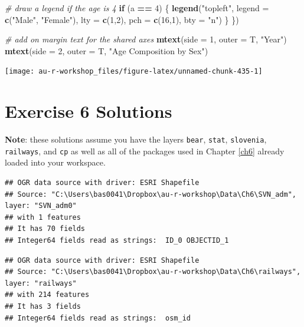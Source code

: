\documentclass[]{book}
\newenvironment{Shaded}{\begin{snugshade}}{\end{snugshade}}
\newcommand{\KeywordTok}[1]{\textcolor[rgb]{0.13,0.29,0.53}{\textbf{#1}}}
\newcommand{\DataTypeTok}[1]{\textcolor[rgb]{0.13,0.29,0.53}{#1}}
\newcommand{\DecValTok}[1]{\textcolor[rgb]{0.00,0.00,0.81}{#1}}
\newcommand{\StringTok}[1]{\textcolor[rgb]{0.31,0.60,0.02}{#1}}
\newcommand{\CommentTok}[1]{\textcolor[rgb]{0.56,0.35,0.01}{\textit{#1}}}
\newcommand{\ControlFlowTok}[1]{\textcolor[rgb]{0.13,0.29,0.53}{\textbf{#1}}}
\newcommand{\OperatorTok}[1]{\textcolor[rgb]{0.81,0.36,0.00}{\textbf{#1}}}
\newcommand{\NormalTok}[1]{#1}
\theoremstyle{definition}
\theoremstyle{definition}
\theoremstyle{definition}
\theoremstyle{remark}
\begin{document}
\begin{Shaded}
\begin{Highlighting}[]
  \CommentTok{# draw a legend if the age is 4}
  \ControlFlowTok{if}\NormalTok{ (a }\OperatorTok{==}\StringTok{ }\DecValTok{4}\NormalTok{) \{}
    \KeywordTok{legend}\NormalTok{(}\StringTok{"topleft"}\NormalTok{, }\DataTypeTok{legend =} \KeywordTok{c}\NormalTok{(}\StringTok{"Male"}\NormalTok{, }\StringTok{"Female"}\NormalTok{),}
           \DataTypeTok{lty =} \KeywordTok{c}\NormalTok{(}\DecValTok{1}\NormalTok{,}\DecValTok{2}\NormalTok{), }\DataTypeTok{pch =} \KeywordTok{c}\NormalTok{(}\DecValTok{16}\NormalTok{,}\DecValTok{1}\NormalTok{), }\DataTypeTok{bty =} \StringTok{"n"}\NormalTok{)}
\NormalTok{  \}}
\NormalTok{\})}

\CommentTok{# add on margin text for the shared axes}
\KeywordTok{mtext}\NormalTok{(}\DataTypeTok{side =} \DecValTok{1}\NormalTok{, }\DataTypeTok{outer =}\NormalTok{ T, }\StringTok{"Year"}\NormalTok{)}
\KeywordTok{mtext}\NormalTok{(}\DataTypeTok{side =} \DecValTok{2}\NormalTok{, }\DataTypeTok{outer =}\NormalTok{ T, }\StringTok{"Age Composition by Sex"}\NormalTok{)}
\end{Highlighting}
\end{Shaded}

\begin{center}\texttt{[image: au-r-workshop\_files/figure-latex/unnamed-chunk-435-1]} \end{center}

\section*{Exercise 6 Solutions}\label{ex6-answers}

\textbf{Note}: these solutions assume you have the layers \texttt{bear},
\texttt{stat}, \texttt{slovenia}, \texttt{railways}, and \texttt{cp} as
well as all of the packages used in Chapter \ref{ch6} already loaded
into your workspace.

\begin{verbatim}
## OGR data source with driver: ESRI Shapefile 
## Source: "C:\Users\bas0041\Dropbox\au-r-workshop\Data\Ch6\SVN_adm", layer: "SVN_adm0"
## with 1 features
## It has 70 fields
## Integer64 fields read as strings:  ID_0 OBJECTID_1
\end{verbatim}

\begin{verbatim}
## OGR data source with driver: ESRI Shapefile 
## Source: "C:\Users\bas0041\Dropbox\au-r-workshop\Data\Ch6\railways", layer: "railways"
## with 214 features
## It has 3 fields
## Integer64 fields read as strings:  osm_id
\end{verbatim}
\end{document}
